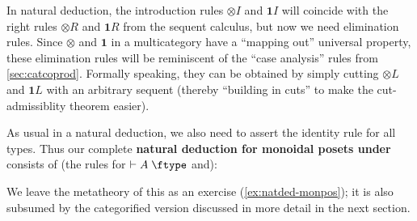 \documentclass{book}
\let\types\vdash
\def\type{\;\ftype}
\def\one{\mathbf{1}}
\let\tensor\otimes
\def\tensorL{\mathord{\tensor}L}
\def\tensorR{\mathord{\tensor}R}
\def\tensorI{\mathord{\tensor}I}
\def\tensorE{\mathord{\tensor}E}
\begin{document}
In natural deduction, the introduction rules $\tensorI$ and $\one I$ will coincide with the right rules $\tensorR$ and $\one R$ from the sequent calculus, but now we need elimination rules.
Since $\tensor$ and $\one$ in a multicategory have a ``mapping out'' universal property, these elimination rules will be reminiscent of the ``case analysis'' rules from \cref{sec:catcoprod}.
Formally speaking, they can be obtained by simply cutting $\tensorL$ and $\one L$ with an arbitrary sequent (thereby ``building in cuts'' to make the cut-admissiblity theorem easier).
As usual in a natural deduction, we also need to assert the identity rule for all types.
Thus our complete \textbf{natural deduction for monoidal posets under \cG} consists of (the rules for $\types A\type$ and):

We leave the metatheory of this as an exercise (\cref{ex:natded-monpos}); it is also subsumed by the categorified version discussed in more detail in the next section.
\end{document}
